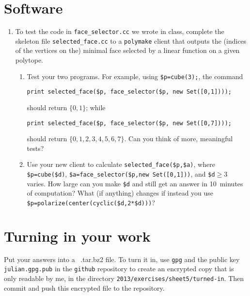 \documentclass[11pt]{amsart}
\begin{document}
 \bigskip
 \section*{Software}

 \begin{enumerate}
   \setlength{\itemsep}{2ex}
 \item To test the code in \texttt{face\_selector.cc} we wrote in class, complete the skeleton file \texttt{selected\_face.cc} to a \texttt{polymake} client that outputs the (indices of the vertices on the) minimal face selected by a linear function on a given polytope. 
\begin{enumerate}
\item Test your two programs. For example, using \verb|$p=cube(3);|,
  the command 
\begin{verbatim}
print selected_face($p, face_selector($p, new Set([0,1])));
\end{verbatim}
should return $\{0,1\}$; while 
\begin{verbatim}
print selected_face($p, face_selector($p, new Set([0,7])));
\end{verbatim}
should return  $\{0,1,2,3,4,5,6,7\}$. Can you think of more, meaningful tests?

\item Use your new client to calculate \verb|selected_face($p,$a)|, where \verb|$p=cube($d)|, \verb|$a=face_selector($p,new Set([0,1]))|, and \verb|$d|${}\ge3$ varies. How large can you make \verb|$d| and still get an answer in 10~minutes of computation? What (if anything) changes if instead you use \verb|$p=polarize(center(cyclic($d,2*$d)))|? 
\end{enumerate}
 \end{enumerate}


\bigskip
\section*{Turning in your work}

Put your answers into a \ .tar.bz2 file. To turn it in, use \texttt{gpg} and the public key \texttt{julian.gpg.pub} in the \texttt{github} repository to create an encrypted copy that is only readable by me, in the directory \texttt{2013/exercises/sheet5/turned-in}. Then commit and push this encrypted file to the repository.
\end{document}
